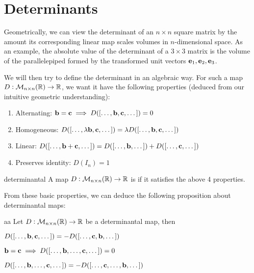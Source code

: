 \documentclass{styles/tufte}
\author{Jiaming (George) Yu}
\date{\today}
\begin{document}
\maketitle
\tableofcontents
\newpage



\section{Determinants}
  
  Geometrically, we can view the determinant of an $n \times n$ square matrix by the amount its corresponding linear map scales volumes in $n$-dimensional space. As an example, the absolute value of the determinant of a $3 \times 3$ matrix is the volume of the parallelepiped formed by the transformed unit vectors $\vb{e}_1, \vb{e}_2, \vb{e}_3$.
  
  We will then try to define the determinant in an algebraic way. For such a map $D: \mathcal{M}_{n\times n}(\mathbb{R}) \to \mathbb{R}$, we want it have the following properties (deduced from our intuitive geometric understanding):
  
  \begin{enumerate}
    \item Alternating: $\vb{b} = \vb{c} \implies D([\dots, \vb{b}, \vb{c}, \dots]) = 0$
    \item Homogeneous: $D([\dots, \lambda \vb{b}, \vb{c}, \dots]) = \lambda D([\dots, \vb{b}, \vb{c}, \dots])$
    \item Linear: $D([\dots, \vb{b} + \vb{c}, \dots]) = D([\dots, \vb{b}, \dots]) + D([\dots, \vb{c}, \dots])$
    \item Preserves identity: $D(I_n) = 1$
  \end{enumerate}
  
  \begin{definition}{}{determinantal}
    A map $D: \mathcal{M}_{n\times n}(\mathbb{R}) \to \mathbb{R}$ is  if it satisfies the above 4 properties.
  \end{definition}
  
  From these basic properties, we can deduce the following proposition about determinantal maps:
  \begin{proposition}{}{aa}
    Let $D: \mathcal{M}_{n\times n}(\mathbb{R}) \to \mathbb{R}$ be a determinantal map, then
    \begin{romanenum}
      \item $D([\dots, \vb{b}, \vb{c}, \dots]) = -D([\dots, \vb{c}, \vb{b}, \dots])$
      \item $\vb{b} = \vb{c} \implies D([\dots, \vb{b}, \dots, \vb{c}, \dots]) = 0$
      \item $D([\dots, \vb{b}, \dots, \vb{c}, \dots]) = -D([\dots, \vb{c}, \dots, \vb{b}, \dots])$
    \end{romanenum}
  \end{proposition}
    
\end{document}
